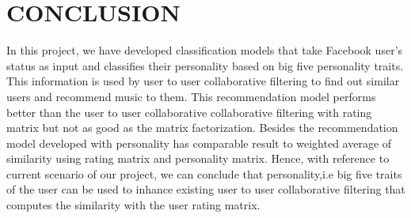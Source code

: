 \newpage
\section{CONCLUSION}
In this project, we have developed classification models that take Facebook user's status as input and classifies their personality based on big five personality traits. This information is used by user to user collaborative filtering to find out similar users and recommend music to them. This recommendation model performs better than the user to user collaborative collaborative filtering with rating matrix but not as good as the matrix factorization. Besides the recommendation model developed with personality has comparable result to weighted average of similarity using rating matrix and personality matrix. Hence, with reference to current scenario of our project, we can conclude that personality,i.e big five traits of the user can be used to inhance existing user to user collaborative filtering that computes the similarity with the user rating matrix.
